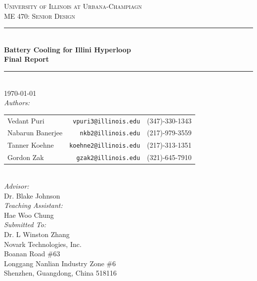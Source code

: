 \documentclass[11pt]{article}
\numberwithin{equation}{subsection} %
\newcommand{\vp}[1]{\textcolor{crimson}   { #1 }}
\newcommand{\tk}[1]{\textcolor{deepskyblue}{ #1 }}
\newcommand{\gz}[1]{\textcolor{orchid}{ #1 }}
\newcommand{\nb}[1]{\textcolor{seagreen}{ #1 }}
\begin{document}
\begin{titlepage}
\newcommand{\HRule}{\rule{\linewidth}{0.5mm}}
\center
\textsc{\LARGE University of Illinois at Urbana-Champiagn}\\[1cm]
\textsc{\Large ME 470: Senior Design}\\[1cm]
\HRule \\[0.4cm]

{ 
  \huge \bfseries Battery Cooling for Illini Hyperloop \\[0.5cm]
  \large Final Report\\[0.5cm]
}

\HRule \\[1cm]
{\Large \today}\\[1cm]
\emph{Authors:}\\
\begin{tabular}{l r l}
  Vedant Puri        & \texttt{vpuri3@illinois.edu}  &  (347)-330-1343 \\
  Nabarun Banerjee   & \texttt{nkb2@illinois.edu}    &  (217)-979-3559 \\
  Tanner Koehne      & \texttt{koehne2@illinois.edu} &  (217)-313-1351 \\
  Gordon Zak         & \texttt{gzak2@illinois.edu}   &  (321)-645-7910 \\
\end{tabular}\\[0.5cm]
\emph{Advisor:} \\
Dr. Blake Johnson\\[0.5cm]
\emph{Teaching Assistant:} \\
Hae Woo Chung \\[0.5cm]
\emph{Submitted To:} \\
Dr. L Winston Zhang \\
Novark Technologies, Inc.\\
Boanan Road \#63\\
Longgang Nanlian Industry Zone \#6\\
Shenzhen, Guangdong, China 518116\\[0.5cm]
\vfill

\end{titlepage}

\tableofcontents
\listoffigures
\begingroup
\let\clearpage\relax
\listoftables
\endgroup

\newpage
\onehalfspacing
\end{document}
